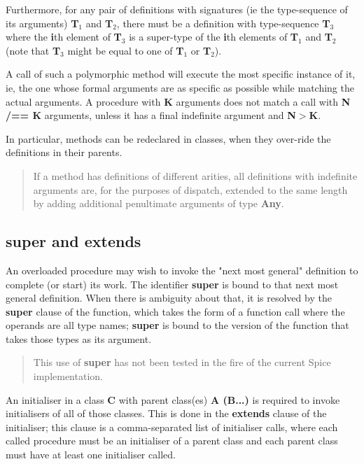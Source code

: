 \documentclass{report}
\begin{document}
Furthermore, for any pair of definitions with signatures (ie the
type-sequence of its arguments) {\bf T$_ 1$} and {\bf T$_ 2$}, there must be a
definition with type-sequence {\bf T$_ 3$} where the {\bf i}th element of {\bf T$_ 3$}
is a super-type of the {\bf i}th elements of {\bf T$_ 1$} and {\bf T$_ 2$} (note that
{\bf T$_ 3$} might be equal to one of {\bf T$_ 1$} or {\bf T$_ 2$}).

A call of such a polymorphic method will execute the most specific instance of
it, ie, the one whose formal arguments are as specific as possible while
matching the actual arguments. A procedure with {\bf K} arguments does not match a
call with {\bf N /== K} arguments, unless it has a final indefinite argument and
{\bf N$>$K}.

In particular, methods can be redeclared in classes, when
they over-ride the definitions in their parents.

\begin{quote}If a method has definitions of different arities, all definitions with
indefinite arguments are, for the purposes of dispatch, extended to the same
length by adding additional penultimate arguments of type {\bf Any}.\end{quote}\subsection{super and extends}


An overloaded procedure may wish to invoke the "next most general" definition
to complete (or start) its work. The identifier {\bf super} is bound to that
next most general definition. When there is ambiguity about that, it is
resolved by the {\bf super} clause of the function, which takes the form of a
function call where the operands are all type names; {\bf super} is bound to the
version of the function that takes those types as its argument.

\begin{quote}This use of {\bf super} has not been tested in the fire of the
    current Spice implementation.
\end{quote}An initialiser in a class {\bf C} with parent class(es) {\bf A (B...)} is
required to invoke initialisers of all of those classes. This is done in
the {\bf extends} clause of the initialiser; this clause is a comma-separated list
of initialiser calls, where each called procedure must be an initialiser
of a parent class and each parent class must have at least one initialiser
called.
\end{document}

